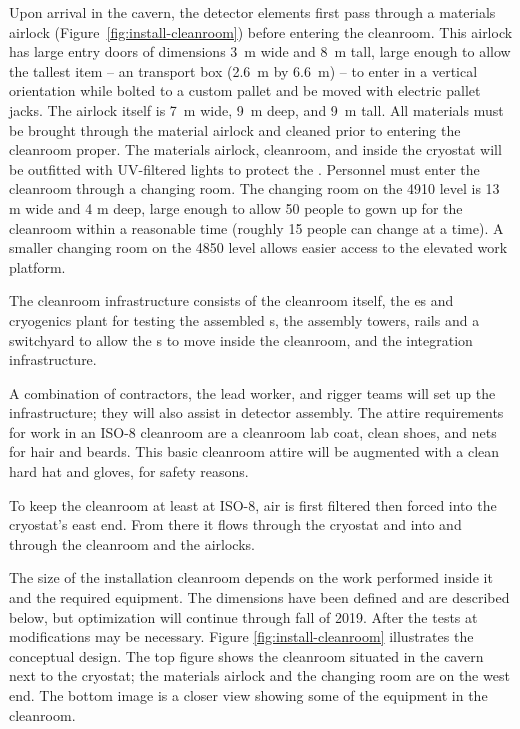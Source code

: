 Upon arrival in the cavern, the detector elements first pass through a materials airlock (Figure~\ref{fig:install-cleanroom}) before entering the cleanroom. This airlock has large entry doors of dimensions \SI{3}{m} wide and \SI{8}{m} tall, large enough to allow the tallest item -- an  transport box (\SI{2.6}{m} by \SI{6.6}{m}) -- to enter in a vertical orientation while bolted to a custom pallet and be moved with electric pallet jacks. 
The airlock itself is \SI{7}{m} wide, \SI{9}{m} deep, and \SI{9}{m} tall. All materials must be brought through the material airlock and cleaned prior to entering the cleanroom proper. 
The materials airlock, cleanroom, and inside the cryostat will be outfitted with UV-filtered lights to protect the . 
Personnel must enter the cleanroom through a changing room. The changing room on the 4910 level is 13 \si{m} wide and 4 \si{m} deep, %
large enough to allow 50 people to gown up for the cleanroom within a reasonable time (roughly 15 people can change at a time). A smaller changing room on the 4850 level allows easier access to the elevated work platform.


The cleanroom infrastructure consists of the cleanroom itself, the \coldbox{}es and cryogenics plant for testing the assembled s, the assembly towers, rails and a switchyard to allow the s to move inside the cleanroom, and the  integration infrastructure. 

A combination of contractors, the lead worker, and rigger teams will set up the infrastructure;  they will also assist in detector assembly. 
The attire requirements for work in an ISO-8 cleanroom are a cleanroom lab coat, clean shoes, and nets for hair and beards.  This basic cleanroom attire will be augmented with a clean hard hat and gloves, for safety reasons. 

To keep the cleanroom at least at ISO-8, air is first filtered then forced into the cryostat's east end. 
From there it flows through the cryostat and into and through the cleanroom and the airlocks. 


The size of the installation cleanroom depends on the work performed inside it and the required equipment. The dimensions have been defined and are described below, but optimization will continue through fall of 2019.
After the tests at  modifications may be necessary. 
Figure \ref{fig:install-cleanroom} illustrates  the conceptual design. The top figure shows the cleanroom situated in the cavern next to the cryostat; the materials airlock and the changing room are on the west end. The bottom image is a closer view showing some of the equipment in the cleanroom. 

